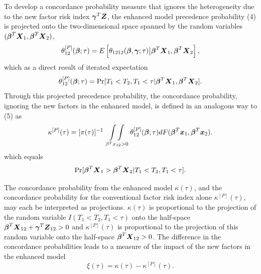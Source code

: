 \documentclass[12pt]{article}
\newcommand{\bmx}{\mbox{\boldmath $x$}}
\newcommand{\bmX}{\mbox{\boldmath $X$}}
\newcommand{\bg}{\mbox{\boldmath $\gamma$}}
\newcommand{\bb}{\mbox{\boldmath $\beta$}}
\newcommand{\bmZ}{\mbox{\boldmath $Z$}}
\def\stackunder#1#2{\mathrel{\mathop{#2}\limits_{#1}}}
\begin{document}
\noindent  To develop a concordance probability measure that ignores the heterogeneity due to the new factor risk index $\bg^T \bmZ$, the enhanced model precedence probability (4) is projected onto the two-dimensional space spanned by the random variables $(\bb^T \bmX_1, \bb^T \bmX_2)$,
\begin{equation} \theta_{12}^{[P]}(\bb; \tau) = E\left[ \theta_{1212}(\bb, \bg;\tau) \big| \bb^T\bmX_1, \bb^T\bmX_2 \right] , \end{equation}
which as a direct result of iterated expectation
\[    \theta_{12}^{[P]}(\bb; \tau) = \mbox{Pr}[T_1 < T_2, T_1 < \tau | \bb^T \bmX_1, \bb^T \bmX_2] . \]
Through this projected precedence probability, the concordance probability, ignoring the new factors in the enhanced model, is defined in an analogous way to (5) as
\begin{equation} \kappa^{[P]}(\tau) = [\pi(\tau)]^{-1} \stackunder{\beta^T x_{12} >  0}{\int \int}  \theta_{12}^{[P]}(\bb; \tau) dF(\bb^T\bmx_1, \bb^T\bmx_2) .\end{equation}
which equals 
\begin{equation}\mbox{Pr}[\bb^T \bmX_1 > \bb^T \bmX_2 | T_1 < T_2, T_1 < \tau]. \end{equation}

The concordance probability from the enhanced model $\kappa(\tau)$, and the concordance probability for the conventional factor risk index alone $\kappa^{[P]}(\tau)$, may each be interpreted as projections. $\kappa(\tau)$ is proportional to the projection of the random variable $I(T_1 < T_2, T_1 < \tau)$ onto the half-space $\bb^T\bmX_{12} + \bg^T\bmZ_{12}  > 0$ and $\kappa^{[P]}(\tau)$ is proportional to the projection of this random variable onto the half-space $\bb^T\bmX_{12}  >0$. The difference in the concordance probabilities leads to a measure of the impact of the new factors in the enhanced model
\begin{equation}  \xi(\tau) = \kappa(\tau) - \kappa^{[P]}(\tau) .\end{equation}
\end{document}
